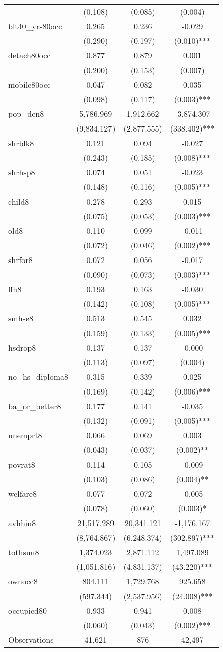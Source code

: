 \begin{tabular}{lccc}
&(0.108)&(0.085)&(0.004)\\
blt40\_yrs80occ&0.265&0.236&-0.029\\
&(0.290)&(0.197)&(0.010)***\\
detach80occ&0.877&0.879&0.001\\
&(0.200)&(0.153)&(0.007)\\
mobile80occ&0.047&0.082&0.035\\
&(0.098)&(0.117)&(0.003)***\\
pop\_den8&5,786.969&1,912.662&-3,874.307\\
&(9,834.127)&(2,877.555)&(338.402)***\\
shrblk8&0.121&0.094&-0.027\\
&(0.243)&(0.185)&(0.008)***\\
shrhsp8&0.074&0.051&-0.023\\
&(0.148)&(0.116)&(0.005)***\\
child8&0.278&0.293&0.015\\
&(0.075)&(0.053)&(0.003)***\\
old8&0.110&0.099&-0.011\\
&(0.072)&(0.046)&(0.002)***\\
shrfor8&0.072&0.056&-0.017\\
&(0.090)&(0.073)&(0.003)***\\
ffh8&0.193&0.163&-0.030\\
&(0.142)&(0.108)&(0.005)***\\
smhse8&0.513&0.545&0.032\\
&(0.159)&(0.133)&(0.005)***\\
hsdrop8&0.137&0.137&-0.000\\
&(0.113)&(0.097)&(0.004)\\
no\_hs\_diploma8&0.315&0.339&0.025\\
&(0.169)&(0.142)&(0.006)***\\
ba\_or\_better8&0.177&0.141&-0.035\\
&(0.132)&(0.091)&(0.005)***\\
unemprt8&0.066&0.069&0.003\\
&(0.043)&(0.037)&(0.002)**\\
povrat8&0.114&0.105&-0.009\\
&(0.103)&(0.086)&(0.004)**\\
welfare8&0.077&0.072&-0.005\\
&(0.078)&(0.060)&(0.003)*\\
avhhin8&21,517.289&20,341.121&-1,176.167\\
&(8,764.867)&(6,248.374)&(302.897)***\\
tothsun8&1,374.023&2,871.112&1,497.089\\
&(1,051.816)&(4,831.137)&(43.220)***\\
ownocc8&804.111&1,729.768&925.658\\
&(597.344)&(2,537.956)&(24.008)***\\
occupied80&0.933&0.941&0.008\\
&(0.060)&(0.043)&(0.002)***\\
\hline
Observations & 41,621 & 876 & 42,497  \\
\hline\hline
\end{tabular}
